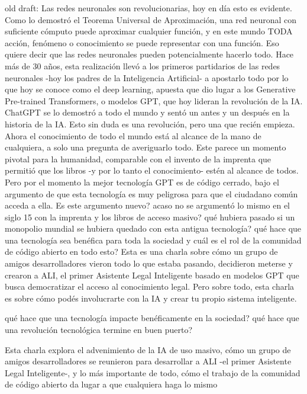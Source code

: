 old draft: 
Las redes neuronales son revolucionarias, hoy en día esto es evidente. 
Como lo demostró el Teorema Universal de Aproximación, una red neuronal con suficiente cómputo puede
aproximar cualquier función, y en este mundo TODA acción, fenómeno o conocimiento se puede 
representar con una función. Eso quiere decir que las redes neuronales pueden potencialmente hacerlo todo.
Hace más de 30 años, esta realización llevó a los primeros partidarios de las redes neuronales -hoy los padres
de la Inteligencia Artificial- a apostarlo todo por lo que hoy se conoce como el deep learning, apuesta que 
dio lugar a los Generative Pre-trained Transformers, o modelos GPT, que hoy lideran la revolución de la IA. 
ChatGPT se lo demostró a todo el mundo y sentó un antes y un después en la historia de la IA. Esto sin duda
es una revolución, pero una que recién empieza. Ahora el conocimiento de todo el mundo
está al alcance de la mano de cualquiera, a solo una pregunta de averiguarlo todo. Este parece un momento pivotal
para la humanidad, comparable con el invento de la imprenta que permitió que los libros -y por lo tanto el conocimiento- estén al alcance de todos. 
Pero por el momento la mejor tecnología GPT es de código cerrado, bajo el argumento de que esta tecnología es muy 
peligrosa para que el ciudadano común acceda a ella. Es este argumento nuevo? acaso no se argumentó lo mismo
en el siglo 15 con la imprenta y los libros de acceso masivo? qué hubiera pasado si un monopolio mundial se hubiera
quedado con esta antigua tecnología? qué hace que una tecnología sea benéfica para toda la sociedad y cuál es el rol de 
la comunidad de código abierto en todo esto?
Esta es una charla sobre cómo un grupo de amigos desarrolladores vieron todo lo que estaba pasando, decidieron meterse y 
crearon a ALI, el primer Asistente Legal Inteligente basado en modelos GPT que busca democratizar el acceso al conocimiento legal. 
Pero sobre todo, esta charla es sobre cómo podés involucrarte con la IA y crear tu propio sistema inteligente. 










qué hace que una tecnología impacte benéficamente en la sociedad?
qué hace que una revolución tecnológica termine en buen puerto? 

Esta charla explora el advenimiento de la IA de uso masivo, cómo un grupo de amigos desarrolladores se 
reunieron para desarrollar a ALI -el primer Asistente Legal Inteligente-, y lo más importante de todo, 
cómo el trabajo de la comunidad de código abierto da lugar a que cualquiera haga lo mismo



